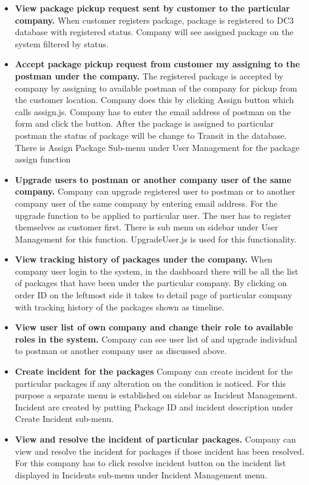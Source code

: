 \begin{itemize}
\item \textbf{View package pickup request sent by customer to the particular company.}
When customer registers package, package is registered to DC3 database with registered status. Company will see assigned package on the system filtered by status.
\item \textbf{Accept package pickup request from customer my assigning to the postman under the company.}
The registered package is accepted by company by assigning to available postman of the company for pickup from the customer location. Company does this by clicking Assign button which calls assign.js. Company has to enter the email address of postman on the form and click the button. After the package is assigned to particular postman the status of package will be change to Transit in the database. There is Assign Package Sub-menu under User Management for the package assign function
\item \textbf{Upgrade users to postman or another company user of the same company.}
Company can upgrade registered user to postman or to another company user of the same company by entering email address. For the upgrade function to be applied to particular user. The user has to register themselves as customer first. There is sub menu on sidebar under User Management for this function. UpgradeUser.js is used for this functionality.
\item \textbf{View tracking history of packages under the company.}
When company user login to the system, in the dashboard there will be all the list of packages that have been under the particular company. By clicking on order ID on the leftmost side it takes to detail page of particular company with tracking history of the packages shown as timeline.
\item \textbf{View user list of own company and change their role to available roles in the system.}
Company can see user list of and upgrade individual to postman or another company user as discussed above.
\item \textbf{Create incident for the packages}
Company can create incident for the particular packages if any alteration on the condition is noticed. For this purpose a separate menu is established on sidebar as Incident Management. Incident are created by putting Package ID and incident description under Create Incident sub-menu. 
\item \textbf{View and resolve the incident of particular packages.}
Company can view and resolve the incident for packages if those incident has been resolved. For this company has to click resolve incident button on the incident list displayed in Incidents sub-menu under Incident Management menu.
\end{itemize}


